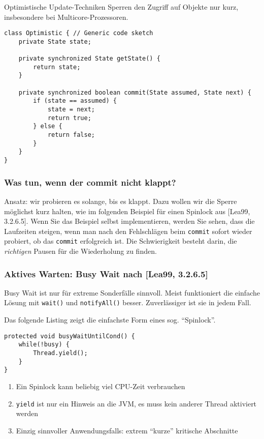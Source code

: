 Optimistische Update-Techniken Sperren den Zugriff auf Objekte nur kurz,
insbesondere bei Multicore-Prozessoren.

\begin{verbatim}
class Optimistic { // Generic code sketch
    private State state;

    private synchronized State getState() {
        return state;
    }

    private synchronized boolean commit(State assumed, State next) {
        if (state == assumed) {
            state = next;
            return true;
        } else {
            return false;
        }
    }
}
\end{verbatim}

\subsubsection{Was tun, wenn der commit nicht
klappt?}\label{was-tun-wenn-der-commit-nicht-klappt}

Ansatz: wir probieren es solange, bis es klappt. Dazu wollen wir die
Sperre möglichst kurz halten, wie im folgenden Beispiel für einen
Spinlock aus {[}Lea99, 3.2.6.5{]}. Wenn Sie das Beispiel selbst
implementieren, werden Sie sehen, dass die Laufzeiten steigen, wenn man
nach den Fehlschlägen beim \texttt{commit} sofort wieder probiert, ob
das \texttt{commit} erfolgreich ist. Die Schwierigkeit besteht darin,
die \emph{richtigen} Pausen für die Wiederholung zu finden.

\subsubsection{Aktives Warten: Busy Wait nach {[}Lea99,
3.2.6.5{]}}\label{aktives-warten-busy-wait-nach-lea99-3.2.6.5}

\begin{important}
Busy Wait ist nur für extreme Sonderfälle sinnvoll. Meist funktioniert die
einfache Lösung mit \texttt{wait()} und
\texttt{notifyAll()} besser. Zuverlässiger ist sie in jedem Fall.
\end{important}

Das folgende Listing zeigt die einfachste Form eines sog. ``Spinlock''.

\begin{verbatim}
protected void busyWaitUntilCond() {
    while(!busy) {
        Thread.yield();
    }
}
\end{verbatim}

\begin{enumerate}
\def\labelenumi{\arabic{enumi}.}
\tightlist
\item
  Ein Spinlock kann beliebig viel CPU-Zeit verbrauchen
\item
  \texttt{yield} ist nur ein Hinweis an die JVM, es muss kein
  anderer Thread aktiviert werden
\item
  Einzig sinnvoller Anwendungsfalls: extrem ``kurze'' kritische
  Abschnitte
\end{enumerate}

